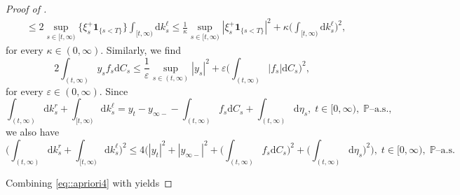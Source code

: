 \documentclass[10pt]{article} %
\def \P{\mathbb{P}}
\newcommand{\1}{\mathbf{1}}
\def\d{\mathrm{d}}
\begin{document}
\begin{proof}[Proof of ]
\begin{align}
	&\leq 2 \sup_{s \in [t,\infty)} \big\{\xi^+_s \mathbf{1}_{\{s < T\}} \big\}\int_{[t,\infty)} \d k^\ell_s 
	\leq \frac{1}{\kappa} \sup_{s \in [t,\infty)} |\xi^+_s \mathbf{1}_{\{s < T\}}|^2  + \kappa \bigg(\int_{[t,\infty)} \d k^\ell_s \bigg)^2, \label{eq::cond_kell}
\end{align}
for every $\kappa \in (0,\infty)$. Similarly, we find
\begin{equation}\label{eq::int_y_f_cs}
	2\int_{(t,\infty)} y_s f_s  \d C_s \leq \frac{1}{\varepsilon}\sup_{s \in (t,\infty)} |y_s|^2 + \varepsilon\bigg(\int_{(t,\infty)} |f_s| \d C_s\bigg)^2,
\end{equation}
for every $\varepsilon \in (0,\infty)$. Since
\begin{equation*}
	\int_{(t,\infty)} \d k^r_s + \int_{[t,\infty)} \d k^\ell_s = y_t - y_{\infty-} - \int_{(t,\infty)} f_s \d C_s + \int_{(t,\infty)} \d \eta_s, \; t \in [0,\infty), \; \text{$\P$--a.s.},
\end{equation*}
we also have
\begin{equation}\label{eq::cond_k1}
	\bigg(\int_{(t,\infty)} \d k^r_s + \int_{[t,\infty)} \d k^\ell_s \bigg)^2 \leq 4 \bigg( |y_t|^2 + |y_{\infty-}|^2 + \bigg(\int_{(t,\infty)} f_s \d C_s\bigg)^2 + \bigg(\int_{(t,\infty)} \d \eta_s\bigg)^2 \bigg), \; t \in [0,\infty), \; \text{$\P$--a.s.}
\end{equation}

Combining \eqref{eq::apriori4} with  yields


\end{proof}
\end{document}
